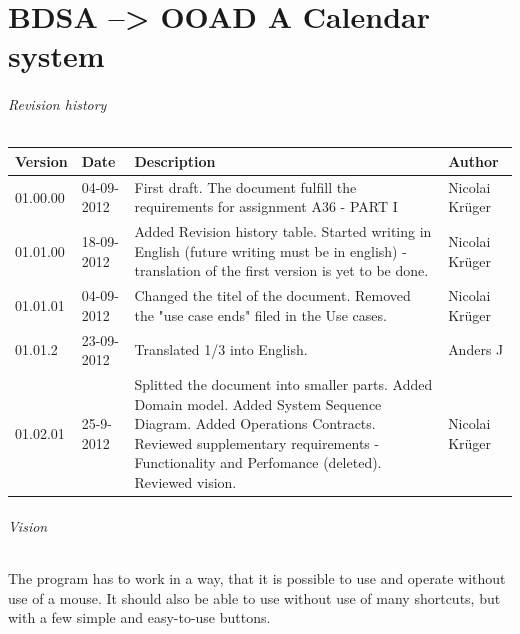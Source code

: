 \documentclass{article}
\begin{document}
  
  \part*{BDSA --> OOAD \linebreak A Calendar system}
  
  \paragraph{Revision history} \mbox{}  
  
  \begin{table}[ht]
    \begin{tabular}{|p{35pt}|p{50pt}|p{150pt}|p{75pt}|}
        \hline
        Version & Date &
        Description & 
        Author         
        \\ \hline
        01.00.00 & 04-09-2012 & 
        First draft. The document fulfill the requirements for assignment A36 - PART I &
        Nicolai Krüger 
        \\ \hline        
        01.01.00 & 18-09-2012 & 
        Added Revision history table. Started writing in English (future writing must be in english) - translation of the first version is yet to be done. & 
        Nicolai Krüger              
        \\ \hline
        01.01.01 & 04-09-2012 &
        Changed the titel of the document. \linebreak
        Removed the "use case ends" filed in the Use cases. &
        Nicolai Krüger
        \\ \hline
        01.01.2 & 23-09-2012 & 
        Translated 1/3 into English. &
        Anders J
        \\ \hline
        01.02.01 & 25-9-2012 &
        Splitted the document into smaller parts.
        Added Domain model.
        Added System Sequence Diagram.
        Added Operations Contracts.
        Reviewed supplementary requirements - Functionality and Perfomance (deleted).
        Reviewed vision. &
        Nicolai Krüger
        \\ \hline
    \end{tabular}
\end{table}
  
  \paragraph{Vision} \mbox{} 
  
  The program has to work in a way, that it is possible to use and operate without use of a mouse. It should also be able to use without use of many shortcuts, but with a few simple and easy-to-use buttons. 
  
\end{document}
